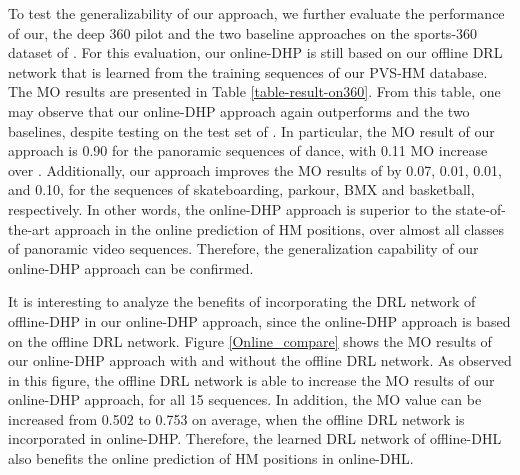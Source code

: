 \documentclass[10pt,journal,compsoc]{IEEEtran}
\begin{document}
To test the generalizability of our approach, we further evaluate the performance of our, the deep 360 pilot \cite{hu2017deep} and the two baseline approaches on the  sports-360 dataset of \cite{hu2017deep}. For this evaluation, our online-DHP is still based on our offline DRL network that is learned from the training sequences of our PVS-HM database. The MO results are presented in Table \ref{table-result-on360}. From this table, one may observe that our online-DHP approach again outperforms \cite{hu2017deep} and the two baselines, despite testing on the test set of \cite{hu2017deep}. In particular, the MO result of our approach is 0.90  for the panoramic sequences of dance, with 0.11 MO increase over \cite{hu2017deep}. Additionally, our approach improves the MO results of \cite{hu2017deep} by 0.07, 0.01, 0.01, and 0.10, for the sequences of skateboarding, parkour, BMX and basketball, respectively. In other words, the online-DHP approach is superior to the state-of-the-art approach \cite{hu2017deep} in the online prediction of HM positions, over almost all classes of panoramic video sequences.  Therefore, the generalization capability of our online-DHP approach can be confirmed.

It is interesting to analyze the benefits of incorporating the DRL network of offline-DHP in our online-DHP approach, since the online-DHP approach is based on the offline DRL network. Figure \ref{Online_compare} shows the MO results of our online-DHP approach with and without the offline DRL network. As observed in this figure, the offline DRL network is able to increase the MO results of our online-DHP approach, for all 15 sequences. In addition, the MO value can be increased from 0.502 to 0.753 on average, when the offline DRL network is incorporated in online-DHP. Therefore, the learned DRL network of offline-DHL also benefits the online prediction of HM positions in online-DHL.

\end{document}
